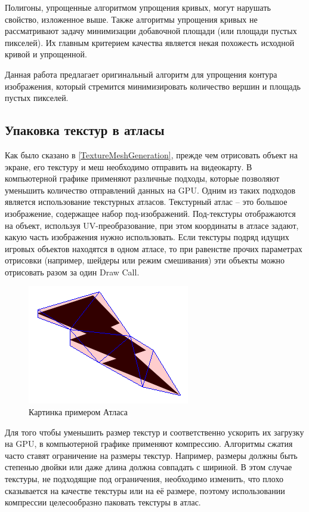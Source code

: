 \documentclass{fefu_thesis/cls/fefu}
\begin{document}
    Полигоны, упрощенные алгоритмом упрощения кривых, могут нарушать свойство, изложенное выше. Также алгоритмы упрощения кривых не рассматривают задачу минимизации добавочной площади (или площади пустых пикселей). Их главным критерием качества является некая похожесть исходной кривой и упрощенной.

    Данная работа предлагает оригинальный алгоритм для упрощения контура изображения, который стремится минимизировать количество вершин и площадь пустых пикселей.

    \subsection{Упаковка текстур в атласы}

    Как было сказано в \ref{TextureMeshGeneration}, прежде чем отрисовать объект на экране, его текстуру и меш необходимо отправить на видеокарту. В компьютерной графике применяют различные подходы, которые позволяют уменьшить количество отправлений данных на GPU. Одним из таких подходов является использование текстурных атласов. Текстурный атлас -- это большое изображение, содержащее набор под-изображений. Под-текстуры отображаются на объект, используя UV-преобразование, при этом координаты в атласе задают, какую часть изображения нужно использовать. Если текстуры подряд идущих игровых объектов находятся в одном атласе, то при равенстве прочих параметрах отрисовки (например, шейдеры или режим смешивания) эти объекты можно отрисовать разом за один Draw Call.

    \begin{figure}[H]
        \centering
        \includegraphics{images/Thunder_approx.png}
        \caption{Картинка примером Атласа}
    \end{figure}

    Для того чтобы уменьшить размер текстур и соответственно ускорить их загрузку на GPU, в компьютерной графике применяют компрессию. Алгоритмы сжатия часто ставят ограничение на размеры текстур. Например, размеры должны быть степенью двойки или даже длина должна совпадать с шириной. В этом случае текстуры, не подходящие под ограничения, необходимо изменить, что плохо сказывается на качестве текстуры или на её размере, поэтому использовании компрессии целесообразно паковать текстуры в атлас.
\end{document}

